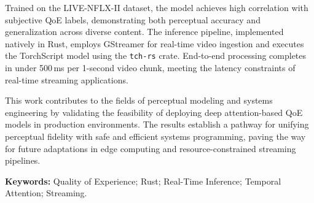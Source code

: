 Trained on the LIVE-NFLX-II dataset, the model achieves high correlation with subjective QoE labels, demonstrating both perceptual accuracy and generalization across diverse content. The inference pipeline, implemented natively in Rust, employs GStreamer for real-time video ingestion and executes the TorchScript model using the \texttt{tch-rs} crate. End-to-end processing completes in under 500\,ms per 1-second video chunk, meeting the latency constraints of real-time streaming applications.

This work contributes to the fields of perceptual modeling and systems engineering by validating the feasibility of deploying deep attention-based QoE models in production environments. The results establish a pathway for unifying perceptual fidelity with safe and efficient systems programming, paving the way for future adaptations in edge computing and resource-constrained streaming pipelines.

\textbf{Keywords:} Quality of Experience; Rust; Real-Time Inference; Temporal Attention; Streaming.